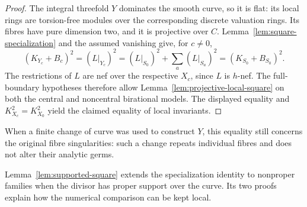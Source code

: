 \begin{proof}
The integral threefold $Y$ dominates the smooth curve, so it is flat:
its local rings are torsion-free modules over the corresponding
discrete valuation rings.  Its fibres have pure dimension two, and
it is projective over $C$.  Lemma~\ref{lem:square-specialization} and
the assumed vanishing give, for $c\ne0$,
\[
 (K_{Y_c}+B_c)^2
 = (L|_{Y_c})^2
 = (L|_{S_0})^2+\sum_a(L|_{S_a})^2
 = (K_{S_0}+B_{S_0})^2.
\]
The restrictions of $L$ are nef over the respective $X_c$, since
$L$ is $h$-nef.  The full-boundary hypotheses therefore allow
Lemma~\ref{lem:projective-local-square} on both the central and
noncentral birational models.  The displayed equality and
$K_{X_c}^2=K_{X_0}^2$ yield the claimed equality of local invariants.
\end{proof}

When a finite change of curve was used to construct $Y$, this equality
still concerns the original fibre singularities: such a change
repeats individual fibres and does not alter their analytic germs.

Lemma~\ref{lem:supported-square} extends the specialization identity to
nonproper families when the divisor has proper support over the curve.
Its two proofs explain how the numerical comparison can be kept local.
